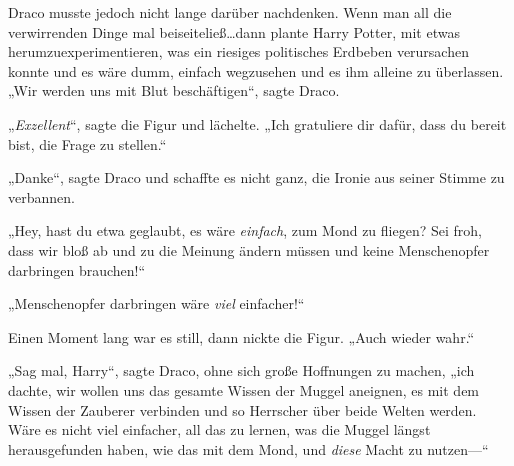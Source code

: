 Draco musste jedoch nicht lange darüber nachdenken. Wenn man all die verwirrenden Dinge mal beiseiteließ…dann plante Harry Potter, mit etwas herumzuexperimentieren, was ein riesiges politisches Erdbeben verursachen konnte und es wäre dumm, einfach wegzusehen und es ihm alleine zu überlassen. „Wir werden uns mit Blut beschäftigen“, sagte Draco.

„\emph{Exzellent}“, sagte die Figur und lächelte. „Ich gratuliere dir dafür, dass du bereit bist, die Frage zu stellen.“

„Danke“, sagte Draco und schaffte es nicht ganz, die Ironie aus seiner Stimme zu verbannen.

„Hey, hast du etwa geglaubt, es wäre \emph{einfach}, zum Mond zu fliegen? Sei froh, dass wir bloß ab und zu die Meinung ändern müssen und keine Menschenopfer darbringen brauchen!“

„Menschenopfer darbringen wäre \emph{viel} einfacher!“

Einen Moment lang war es still, dann nickte die Figur. „Auch wieder wahr.“

„Sag mal, Harry“, sagte Draco, ohne sich große Hoffnungen zu machen, „ich dachte, wir wollen uns das gesamte Wissen der Muggel aneignen, es mit dem Wissen der Zauberer verbinden und so Herrscher über beide Welten werden. Wäre es nicht viel einfacher, all das zu lernen, was die Muggel längst herausgefunden haben, wie das mit dem Mond, und \emph{diese} Macht zu nutzen—“

